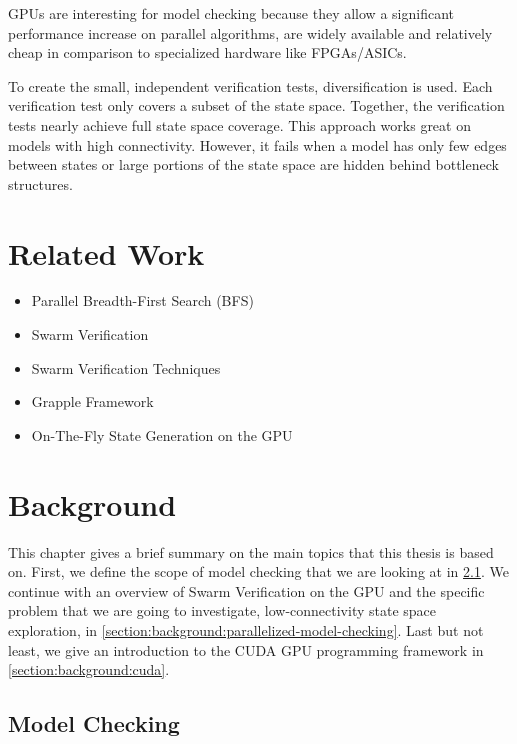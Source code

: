 \documentclass[
fancyheadings, %
%
%
]{stsreprt}
\begin{document}
GPUs are interesting for model checking because they allow a significant performance increase on parallel algorithms, are widely available and relatively cheap in comparison to specialized hardware like FPGAs/ASICs.


To create the small, independent verification tests, diversification is used.
Each verification test only covers a subset of the state space.
Together, the verification tests nearly achieve full state space coverage.
This approach works great on models with high connectivity.
However, it fails when a model has only few edges between states or large portions of the state space are hidden behind bottleneck structures.

\chapter{Related Work}

\begin{itemize}
    \item Parallel Breadth-First Search (BFS) \cite{Holzmann2012.Paralellizing-SPIN}
    \item Swarm Verification \cite{Holzmann2008.Swarm-Verification}
    \item Swarm Verification Techniques \cite{Holzmann2011.Swarm-Verification-Techniques}
    \item Grapple Framework \cite{DeFrancisco2020.Grapple}
    \item On-The-Fly State Generation on the GPU \cite{Bartocci2014.GPGPU-Parallel-SPIN}
\end{itemize}

\chapter{Background}

This chapter gives a brief summary on the main topics that this thesis is based on.
First, we define the scope of model checking that we are looking at in \cref{section:background:model-checking}.
We continue with an overview of Swarm Verification on the GPU and the specific problem that we are going to investigate, low-connectivity state space exploration, in \cref{section:background:parallelized-model-checking}.
Last but not least, we give an introduction to the CUDA GPU programming framework in \cref{section:background:cuda}.

\section{Model Checking}
\label{section:background:model-checking}
\end{document}
